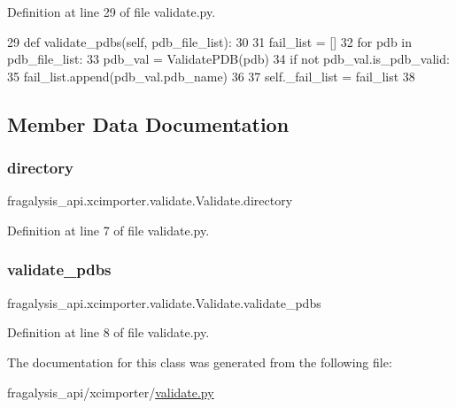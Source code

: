 Definition at line 29 of file validate.\+py.


\begin{DoxyCode}
29     \textcolor{keyword}{def }validate\_pdbs(self, pdb\_file\_list):
30 
31         fail\_list = []
32         \textcolor{keywordflow}{for} pdb \textcolor{keywordflow}{in} pdb\_file\_list:
33             pdb\_val = ValidatePDB(pdb)
34             \textcolor{keywordflow}{if} \textcolor{keywordflow}{not} pdb\_val.is\_pdb\_valid:
35                 fail\_list.append(pdb\_val.pdb\_name)
36 
37         self.\_fail\_list = fail\_list
38 
\end{DoxyCode}


\subsection{Member Data Documentation}
\mbox{\label{classfragalysis__api_1_1xcimporter_1_1validate_1_1_validate_a4ef4b2db6e032059c04e6dead4a8998f}} 
\subsubsection{\texorpdfstring{directory}{directory}}
{\footnotesize\ttfamily fragalysis\+\_\+api.\+xcimporter.\+validate.\+Validate.\+directory}



Definition at line 7 of file validate.\+py.

\mbox{\label{classfragalysis__api_1_1xcimporter_1_1validate_1_1_validate_a73358370d6a752874ee4641f4709eb67}} 
\subsubsection{\texorpdfstring{validate\+\_\+pdbs}{validate\_pdbs}}
{\footnotesize\ttfamily fragalysis\+\_\+api.\+xcimporter.\+validate.\+Validate.\+validate\+\_\+pdbs}



Definition at line 8 of file validate.\+py.



The documentation for this class was generated from the following file\+:\begin{DoxyCompactItemize}
\item 
fragalysis\+\_\+api/xcimporter/\hyperlink{validate_8py}{validate.\+py}\end{DoxyCompactItemize}

